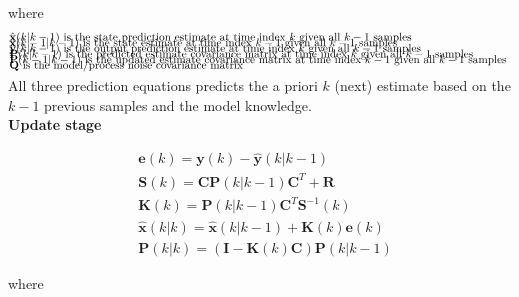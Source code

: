 where 
\begin{align*}
	&\text{$\hat{\textbf{x}}	(k|k-1)$ 	is the state prediction 			estimate at time index $k$ 		given all $ k-1 $ samples		}	\\[-1em]
	&\text{$\hat{\textbf{x}}	(k-1|k-1)$ 	is the state 						estimate at time index $k-1$ 	given all $ k-1 $ samples		}	\\[-1em]
	&\text{$\hat{\textbf{y}}	(k|k-1)$ 	is the output prediction 			estimate at time index $k$ 		given all $ k-1 $ samples		}	\\[-1em]
	&\text{$\textbf{P}			(k|k-1)$ 	is the predicted estimate  covariance matrix at time index $k$ 		given all $ k-1 $ samples		}	\\[-1em]
	&\text{$\textbf{P}			(k-1|k-1)$ 	is the updated estimate    covariance matrix at time index $k-1$ 	given all $ k-1 $ samples		}	\\[-1em]
	&\text{$\textbf{Q}$						is the model/process noise covariance matrix														}	\\[-1em]
\end{align*}

All three prediction equations predicts the a priori $k$ (next) estimate based on the $k-1$ previous samples and the model knowledge.\\
\textbf{Update stage}

\begin{align}
	&\textbf{e}			(k) 		= \textbf{y}(k) - \hat{\textbf{y}}(k|k-1)							\label{eq:Kalman_upd_inno}			\\
	&\textbf{S}			(k) 		= \textbf{C}\textbf{P}(k|k-1)\textbf{C}^T + \textbf{R}				\label{eq:Kalman_upd_inno_cov}		\\
	&\textbf{K}			(k) 		= \textbf{P}(k|k-1)\textbf{C}^T\textbf{S}^{-1}(k)					\label{eq:Kalman_upd_kalman_gain}	\\
	&\hat{\textbf{x}}	(k|k) 		= \hat{\textbf{x}}(k|k-1) + \textbf{K}(k)\textbf{e}(k) 				\label{eq:Kalman_upd_est_state}		\\
	&\textbf{P}			(k|k) 		= (\textbf{I} - \textbf{K}(k)\textbf{C})\textbf{P}(k|k-1)			\label{eq:Kalman_upd_est_cov}
\end{align}

where 

